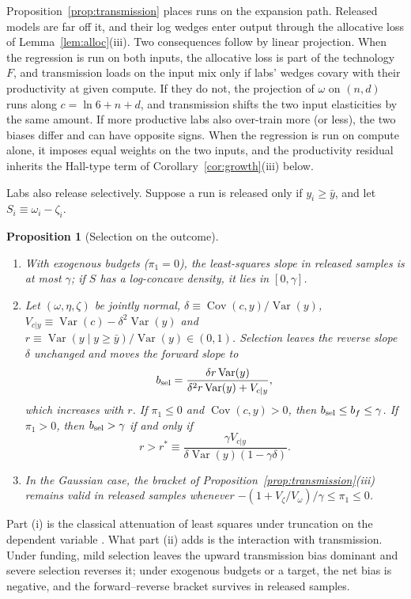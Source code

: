 \documentclass[AER,finalmode]{AEA}
\newtheorem{proposition}{Proposition}
\theoremstyle{definition}
\theoremstyle{remark}
\providecommand{\Var}{\operatorname{Var}}
\providecommand{\Cov}{\operatorname{Cov}}
\begin{document}
Proposition~\ref{prop:transmission} places runs on the expansion path. Released models are far off it, and their log
wedges enter output through the allocative loss of Lemma~\ref{lem:alloc}(iii). Two consequences follow by linear
projection. When the regression is run on both inputs, the allocative loss is part of the technology $F$, and
transmission loads on the input mix only if labs' wedges covary with their productivity at given compute. If they do
not, the projection of $\omega$ on $(n,d)$ runs along $c=\ln6+n+d$, and transmission shifts the two input elasticities
by the same amount. If more productive labs also over-train more (or less), the two biases differ and can have opposite
signs. When the regression is run on compute alone, it imposes equal weights on the two inputs, and the productivity
residual inherits the Hall-type term of Corollary~\ref{cor:growth}(iii) below.

Labs also release selectively. Suppose a run is released only if $y_i\ge\bar y$, and let $S_i\equiv\omega_i-\zeta_i$.

\begin{proposition}[Selection on the outcome]\label{prop:selection}
\begin{enumerate}
\item[(i)] With exogenous budgets ($\pi_1=0$), the least-squares slope in released samples is at most $\gamma$; if $S$
has a log-concave density, it lies in $[0,\gamma]$.
\item[(ii)] Let $(\omega,\eta,\zeta)$ be jointly normal, $\delta\equiv\Cov(c,y)/\Var(y)$,
$V_{c|y}\equiv\Var(c)-\delta^2\Var(y)$ and $r\equiv\Var(y\mid y\ge\bar y)/\Var(y)\in(0,1)$. Selection leaves the
reverse slope $\delta$ unchanged and moves the forward slope to
\[
b_{\rm sel}=\frac{\delta r\Var(y)}{\delta^2r\Var(y)+V_{c|y}},
\]
which increases with $r$. If $\pi_1\le0$ and $\Cov(c,y)>0$, then $b_{\rm sel}\le b_f\le\gamma$. If $\pi_1>0$, then
$b_{\rm sel}>\gamma$ if and only if
\[
r>r^*\equiv\frac{\gamma V_{c|y}}{\delta\Var(y)(1-\gamma\delta)} .
\]
\item[(iii)] In the Gaussian case, the bracket of Proposition~\ref{prop:transmission}(iii) remains valid in released
samples whenever $-(1+V_\zeta/V_\omega)/\gamma\le\pi_1\le0$.
\end{enumerate}
\end{proposition}

Part (i) is the classical attenuation of least squares under truncation on the dependent variable
\citep{hausman1977social,goldberger1981linear}. What part (ii) adds is the interaction with transmission. Under funding,
mild selection leaves the upward transmission bias dominant and severe selection reverses it; under exogenous budgets
or a target, the net bias is negative, and the forward--reverse bracket survives in released samples.
\end{document}
